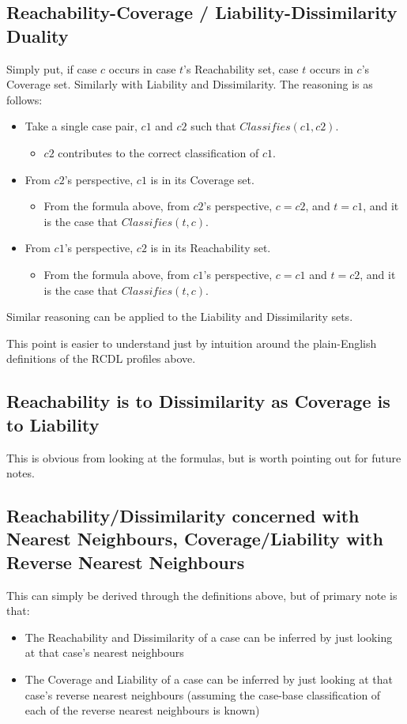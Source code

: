 \documentclass[a4paper,11pt]{report}
\begin{document}
\subsection{Reachability-Coverage / Liability-Dissimilarity Duality}
Simply put, if case $c$ occurs in case $t$'s Reachability set, case $t$ occurs in $c$'s Coverage set. Similarly with Liability and Dissimilarity.
The reasoning is as follows:
\begin{itemize}
	\item Take a single case pair, $c1$ and $c2$ such that $Classifies(c1, c2)$.
	\begin{itemize}
		\item $c2$ contributes to the correct classification of $c1$.
	\end{itemize}
	\item From $c2$'s perspective, $c1$ is in its Coverage set.
	\begin{itemize}
		\item From the formula above, from $c2$'s perspective, $c=c2$, and $t=c1$, and it is the case that $Classifies(t, c)$.
	\end{itemize}
	\item From $c1$'s perspective, $c2$ is in its Reachability set.
	\begin{itemize}
		\item From the formula above, from $c1$'s perspective, $c=c1$ and $t=c2$, and it is the case that $Classifies(t, c)$.
	\end{itemize}
\end{itemize}

Similar reasoning can be applied to the Liability and Dissimilarity sets.

This point is easier to understand just by intuition around the plain-English definitions of the RCDL profiles above.

\subsection{Reachability is to Dissimilarity as Coverage is to Liability}
This is obvious from looking at the formulas, but is worth pointing out for future notes.

\subsection{Reachability/Dissimilarity concerned with Nearest Neighbours, Coverage/Liability with Reverse Nearest Neighbours \label{sec:RdWithNnClWithRnn}}
This can simply be derived through the definitions above, but of primary note is that:
\begin{itemize}
	\item The Reachability and Dissimilarity of a case can be inferred by just looking at that case's nearest neighbours
	\item The Coverage and Liability of a case can be inferred by just looking at that case's reverse nearest neighbours (assuming the case-base classification of each of the reverse nearest neighbours is known)
\end{itemize}
\end{document}
